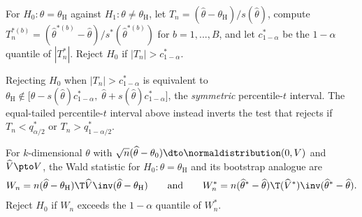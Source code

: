 \documentclass[a4paper,12pt]{article}
\begin{document}
\begin{definition}
	For $H_0:\theta=\theta_{\mathrm H}$ against $H_1:\theta\ne\theta_{\mathrm H}$, let $T_n=(\widehat\theta-\theta_{\mathrm H})/s(\widehat\theta)$,
	compute $T_n^{*(b)}=(\widehat\theta^{*(b)}-\widehat\theta)/s^*(\widehat\theta^{*(b)})$ for $b=1,...,B$,
	and let $c_{1-\alpha}^*$ be the $1-\alpha$ quantile of $|T_n^*|$.
	Reject $H_0$ if $|T_n|>c_{1-\alpha}^*$.
\end{definition}

\begin{remark}
	Rejecting $H_0$ when $|T_n|>c_{1-\alpha}^*$ is equivalent to
	$\theta_{\mathrm H}\notin\bigl[\widehat\theta-s(\widehat\theta)c_{1-\alpha}^*,\;\widehat\theta+s(\widehat\theta)c_{1-\alpha}^*\bigr]$,
	the \emph{symmetric} percentile-$t$ interval.
	The equal-tailed percentile-$t$ interval above instead inverts the test that rejects if $T_n<q_{\alpha/2}^*$ or $T_n>q_{1-\alpha/2}^*$.
\end{remark}

\begin{definition}
	For $k$-dimensional $\theta$ with $\sqrt n(\widehat\theta-\theta_0)\dto\normaldistribution(0,V)$ and $\widehat V\pto V$,
	the Wald statistic for $H_0:\theta=\theta_{\mathrm H}$ and its bootstrap analogue are
	\begin{align}
		W_n=n(\widehat\theta-\theta_{\mathrm H})\T\widehat V\inv(\widehat\theta-\theta_{\mathrm H})
		\qquad\text{and}\qquad
		W_n^*=n(\widehat\theta^*-\widehat\theta)\T(\widehat V^*)\inv(\widehat\theta^*-\widehat\theta).
	\end{align}
	Reject $H_0$ if $W_n$ exceeds the $1-\alpha$ quantile of $W_n^*$.
\end{definition}
\end{document}
